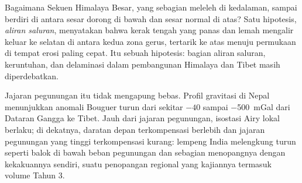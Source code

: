 \begin{omfigure}
\par{}
\end{omfigure}

Bagaimana Sekuen Himalaya Besar, yang sebagian meleleh di kedalaman, sampai berdiri di antara
sesar dorong di bawah dan sesar normal di atas? Satu hipotesis, \emph{aliran saluran}, menyatakan bahwa kerak tengah yang panas
dan lemah mengalir keluar ke selatan di antara kedua zona gerus, tertarik ke atas menuju
permukaan di tempat erosi paling cepat. Itu sebuah hipotesis: bagian aliran saluran, keruntuhan,
dan delaminasi dalam pembangunan Himalaya dan Tibet masih diperdebatkan.

Jajaran pegunungan itu tidak mengapung bebas. Profil gravitasi di Nepal menunjukkan anomali Bouguer
turun dari sekitar $-40$ sampai \qty{-500}{mGal} dari Dataran Gangga ke Tibet. Jauh dari
jajaran pegunungan, isostasi Airy lokal berlaku; di dekatnya, daratan depan terkompensasi berlebih dan jajaran
pegunungan yang tinggi terkompensasi kurang: lempeng India melengkung turun seperti balok di bawah beban
pegunungan dan sebagian menopangnya dengan kekakuannya sendiri, suatu penopangan regional yang kajiannya
termasuk volume Tahun 3.

